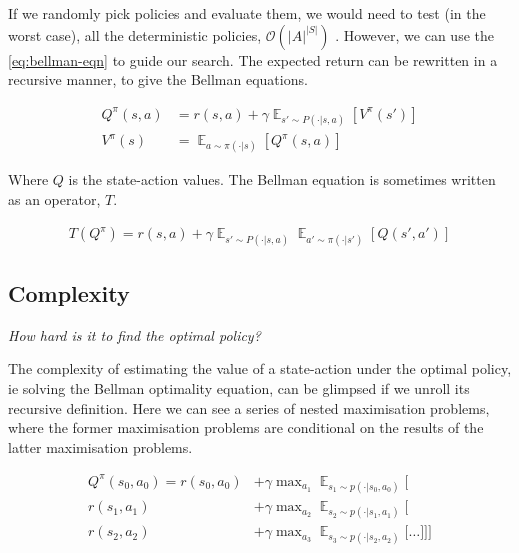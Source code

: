 If we randomly pick policies and evaluate them, we would need to test (in the worst case),
all the deterministic policies, $\mathcal O(|A|^{|S|})$ . However, we can use the \ref{eq:bellman-eqn} to
guide our search. The expected return can be rewritten in a recursive manner, to give the Bellman equations.

\begin{align*}
Q^{\pi}(s, a) &= r(s, a) + \gamma \mathop{\mathbb E}_{s' \sim P(\cdot|s, a)} [V^{\pi}(s')] \label{eq:bellman-eqn}\tag{Bellman equation}\\
V^{\pi}(s) &= \mathop{\mathbb E}_{a \sim \pi(\cdot|s)} [Q^{\pi}(s, a)]
\end{align*}

Where $Q$ is the state-action values.
The Bellman equation is sometimes written as an operator, $T$.

\begin{align*}
T(Q^{\pi}) = r(s, a) + \gamma \mathop{\mathbb E}_{s' \sim P(\cdot|s, a)}\mathop{\mathbb E}_{a'\sim \pi(\cdot | s')} [Q(s', a')]
\end{align*}

\subsection{Complexity}

\begin{displayquote}
  \textsl{How hard is it to find the optimal policy?}
\end{displayquote}

The complexity of estimating the value of a state-action under the optimal policy, ie solving the Bellman optimality
equation, can be glimpsed if we unroll its recursive definition.
Here we can see a series of nested maximisation problems, where the former
maximisation problems are conditional on the results of the latter maximisation problems.

\begin{align*}
Q^{\pi}(s_0, a_0) = r(s_0, a_0) &+ \gamma \mathop{\text{max}}_{a_1} \mathop{\mathbb E}_{s_1\sim p(\cdot | s_0, a_0)} \Bigg[ \\
r(s_1, a_1)  &+ \gamma \mathop{\text{max}}_{a_2} \mathop{\mathbb E}_{s_2\sim p(\cdot | s_1, a_1)} \bigg[\\
r(s_2, a_2)  &+ \gamma \mathop{\text{max}}_{a_3} \mathop{\mathbb E}_{s_3\sim p(\cdot | s_2, a_2)} \Big[
\dots \Big] \bigg] \Bigg]
\end{align*}

